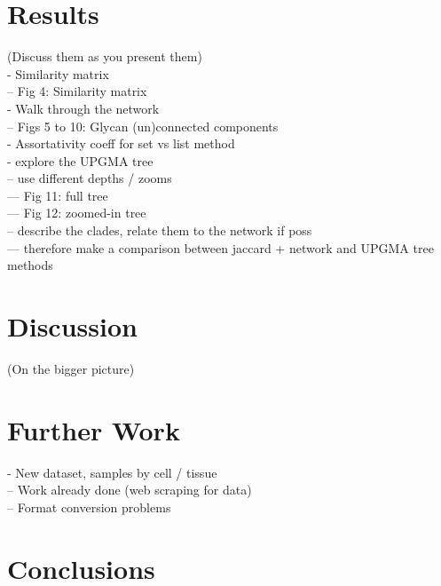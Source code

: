 \documentclass[12pt,a4paper]{article}
\begin{document}
\section{Results}
\label{sec:results}
(Discuss them as you present them)\\

- Similarity matrix\\
-- Fig 4: Similarity matrix\\
- Walk through the network\\
-- Figs 5 to 10: Glycan (un)connected components\\
- Assortativity coeff for set vs list method\\

- explore the UPGMA tree\\
-- use different depths / zooms\\
--- Fig 11: full tree\\
--- Fig 12: zoomed-in tree\\
-- describe the clades, relate them to the network if poss\\
--- therefore make a comparison between jaccard + network and UPGMA tree methods\\


\section{Discussion}
\label{sec:discussion}
(On the bigger picture)\\

\section{Further Work}
\label{sec:further_work}

- New dataset, samples by cell / tissue\\
-- Work already done (web scraping for data)\\
-- Format conversion problems\\


\section{Conclusions}
\label{sec:conclusions}

\newpage
\appendix
\end{document}
